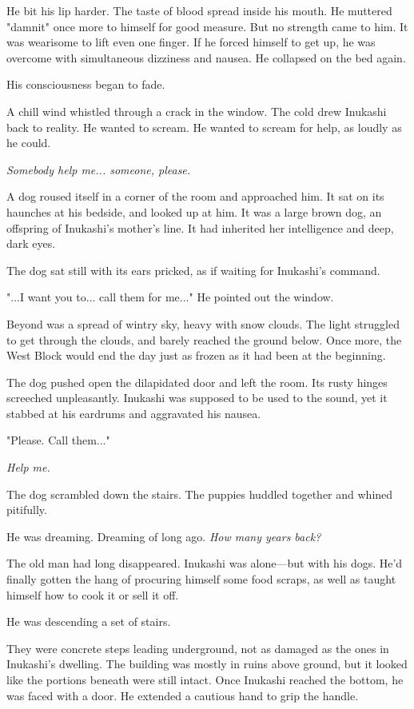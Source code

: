 He bit his lip harder. The taste of blood spread inside his mouth. He
muttered "damnit" once more to himself for good measure. But no strength
came to him. It was wearisome to lift even one finger. If he forced
himself to get up, he was overcome with simultaneous dizziness and
nausea. He collapsed on the bed again.

His consciousness began to fade.

A chill wind whistled through a crack in the window. The cold drew
Inukashi back to reality. He wanted to scream. He wanted to scream for
help, as loudly as he could.

\emph{Somebody help me... someone, please.}

A dog roused itself in a corner of the room and approached him. It sat
on its haunches at his bedside, and looked up at him. It was a large
brown dog, an offspring of Inukashi's mother's line. It had inherited
her intelligence and deep, dark eyes.

The dog sat still with its ears pricked, as if waiting for Inukashi's
command.

"...I want you to... call them for me..." He pointed out the window.

Beyond was a spread of wintry sky, heavy with snow clouds. The light
struggled to get through the clouds, and barely reached the ground
below. Once more, the West Block would end the day just as frozen as it
had been at the beginning.

The dog pushed open the dilapidated door and left the room. Its rusty
hinges screeched unpleasantly. Inukashi was supposed to be used to the
sound, yet it stabbed at his eardrums and aggravated his nausea.

"Please. Call them..."

\emph{Help me.}

The dog scrambled down the stairs. The puppies huddled together and
whined pitifully.

\myspace

He was dreaming. Dreaming of long ago. \emph{How many years back?}

The old man had long disappeared. Inukashi was alone---but with his dogs.
He'd finally gotten the hang of procuring himself some food scraps, as
well as taught himself how to cook it or sell it off.

He was descending a set of stairs.

They were concrete steps leading underground, not as damaged as the ones
in Inukashi's dwelling. The building was mostly in ruins above ground,
but it looked like the portions beneath were still intact. Once Inukashi
reached the bottom, he was faced with a door. He extended a cautious
hand to grip the handle.

